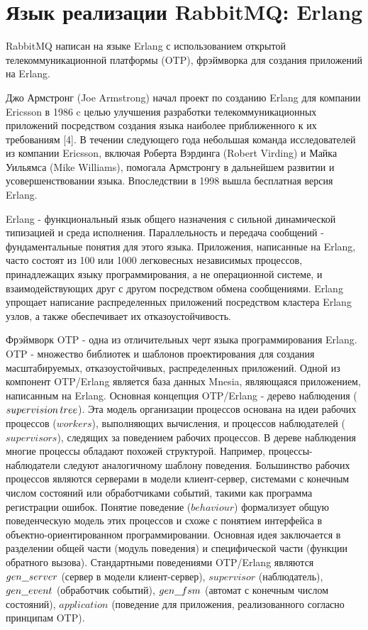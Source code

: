 \section{Язык реализации RabbitMQ: Erlang}
RabbitMQ написан на языке Erlang с использованием  открытой телекоммуникационной платформы (OTP),
фрэймворка для создания приложений на Erlang. \par
Джо Армстронг (Joe Armstrong) начал проект по созданию Erlang для компании Ericsson в 1986 c целью улучшения разработки телекоммуникационных приложений посредством создания языка наиболее приближенного к их требованиям [4]. В течении следующего года небольшая команда исследователей из компании Ericsson, включая Роберта Вэрдинга (Robert Virding) и Майка Уильямса (Mike Williams), помогала Армстронгу в дальнейшем развитии и усовершенствовании языка. Впоследствии в 1998 вышла бесплатная версия Erlang.\par
Erlang - функциональный язык общего назначения с сильной динамической типизацией и среда исполнения. Параллельность и передача сообщений - фундаментальные понятия для этого языка. Приложения, написанные на Erlang, часто состоят из 100 или 1000 легковесных независимых процессов, принадлежащих языку программирования, а не операционной системе, и взаимодействующих друг с другом посредством обмена сообщениями. Erlang упрощает написание распределенных приложений посредством кластера Erlang узлов, а также обеспечивает их отказоустойчивость.\par
Фрэймворк OTP - одна из отличительных черт языка программирования Erlang. OTP - множество библиотек и шаблонов проектирования для создания масштабируемых, отказоустойчивых, распределенных приложений. Одной из компонент OTP/Erlang является база данных Mnesia, являющаяся приложением, написанным на Erlang. Основная концепция OTP/Erlang - дерево наблюдения ($supervision\thinspace tree$). Эта  модель организации процессов основана на идеи рабочих процессов ($workers$), выполняющих вычисления, и процессов наблюдателей ($supervisors$), следящих за поведением рабочих процессов. В дереве наблюдения многие процессы обладают похожей структурой. Например, процессы-наблюдатели следуют аналогичному шаблону поведения. Большинство рабочих процессов являются серверами в модели клиент-сервер, системами с конечным числом состояний  или обработчиками событий, такими как программа регистрации ошибок. Понятие поведение ($behaviour$) формализует общую поведенческую модель этих процессов и схоже с понятием интерфейса в объектно-ориентированном программировании.  Основная идея заключается в разделении общей части (модуль поведения) и специфической части (функции обратного вызова). Стандартными поведениями OTP/Erlang являются $gen\underline{\hspace{0.25cm}}server$ (сервер в модели клиент-сервер), $supervisor$ (наблюдатель), $gen\underline{\hspace{0.25cm}}event$ (обработчик событий), $gen\underline{\hspace{0.25cm}}fsm$ (автомат с конечным числом состояний), $application$ (поведение для приложения, реализованного согласно принципам OTP). \par
